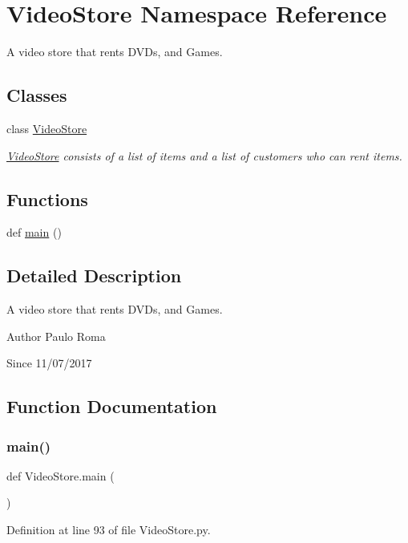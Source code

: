 \hypertarget{namespaceVideoStore}{}\section{Video\+Store Namespace Reference}
\label{namespaceVideoStore}


A video store that rents D\+V\+Ds, and Games.  


\subsection*{Classes}
\begin{DoxyCompactItemize}
\item 
class \hyperlink{classVideoStore_1_1VideoStore}{Video\+Store}
\begin{DoxyCompactList}\small\item\em \hyperlink{classVideoStore_1_1VideoStore}{Video\+Store} consists of a list of items and a list of customers who can rent items. \end{DoxyCompactList}\end{DoxyCompactItemize}
\subsection*{Functions}
\begin{DoxyCompactItemize}
\item 
def \hyperlink{namespaceVideoStore_a6603ba5aae730a23153833ed43d2ad88}{main} ()
\end{DoxyCompactItemize}


\subsection{Detailed Description}
A video store that rents D\+V\+Ds, and Games. 

\begin{DoxyAuthor}{Author}
Paulo Roma 
\end{DoxyAuthor}
\begin{DoxySince}{Since}
11/07/2017 
\end{DoxySince}


\subsection{Function Documentation}
\mbox{\label{namespaceVideoStore_a6603ba5aae730a23153833ed43d2ad88}} 
\subsubsection{\texorpdfstring{main()}{main()}}
{\footnotesize\ttfamily def Video\+Store.\+main (\begin{DoxyParamCaption}{ }\end{DoxyParamCaption})}



Definition at line 93 of file Video\+Store.\+py.

